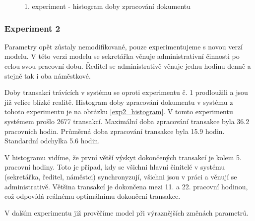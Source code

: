 \documentclass[12pt,a4paper]{article}
\begin{document}
\begin{figure}[ht]
 \begin{center}
    \caption{1. experiment - histogram doby zpracování dokumentu}
    \label{exp1_histogram}
 \end{center}
\end{figure}


\subsubsection{Experiment 2}
Parametry opět zůstaly nemodifikované, pouze experimentujeme s novou verzí mo\-de\-lu. V této verzi modelu se sekretářka věnuje administrativní činnosti po celou svou pracovní dobu. Ředitel se administrativě věnuje jednu hodinu denně a stejně tak i oba náměstkové. 

Doby transakcí trávících v systému se oproti experimentu č. 1 prodloužili a jsou již velice blízké realitě. Histogram doby zpracování dokumentu v systému z tohoto experimentu je na obrázku \ref{exp2_histogram}.
V tomto experimentu systémem prošlo 2677 transakcí. Maximální doba zpracování transakce byla 36.2 pracovních hodin. Průměrná doba zpracování transakce byla 15.9 hodin. Standardní odchylka 5.6 hodin.

V histogramu vidíme, že první větší výskyt dokončených transakcí je kolem 5. pracovní hodiny. Toto je případ, kdy se všichni hlavní činitelé v systému (sekretářka, ředitel, náměstci) synchronyzují, všichni jsou v práci a věnují se administrativě. Většina transakcí je dokončena mezi 11. a 22. pracovní hodinou, což odpovídá reálnému optimálnímu dokončení transakce.

V dalším experimentu již prověříme model při výraznějších změnách parametrů.
\end{document}
